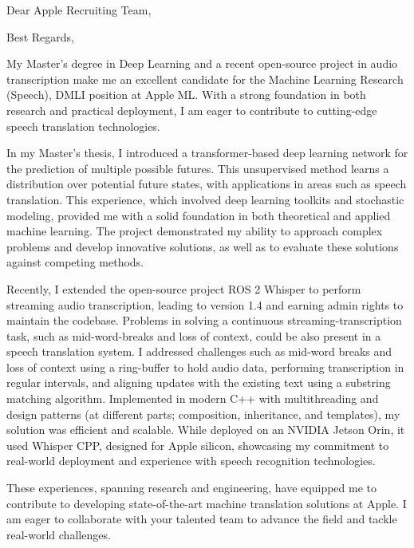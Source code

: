 \documentclass[11pt,a4paper,skipsamekey]{moderncv}
\begin{document}
	\date{\today}
	\opening{Dear Apple Recruiting Team,}
	\closing{Best Regards,}
	\makelettertitle
	
	
	My Master’s degree in Deep Learning and a recent open-source project in audio transcription make me an excellent candidate for the Machine Learning Research (Speech), DMLI position at Apple ML. With a strong foundation in both research and practical deployment, I am eager to contribute to cutting-edge speech translation technologies.
	
	In my Master’s thesis, I introduced a transformer-based deep learning network for the prediction of multiple possible futures. This unsupervised method learns a distribution over potential future states, with applications in areas such as speech translation. This experience, which involved deep learning toolkits and stochastic modeling, provided me with a solid foundation in both theoretical and applied machine learning. The project demonstrated my ability to approach complex problems and develop innovative solutions, as well as to evaluate these solutions against competing methods.
	
	
	Recently, I extended the open-source project ROS 2 Whisper to perform streaming audio transcription, leading to version 1.4 and earning admin rights to maintain the codebase. 
	Problems in solving a continuous streaming-transcription task, such as mid-word-breaks and loss of context, could be also present in a speech translation system.  
	I addressed challenges such as mid-word breaks and loss of context using a ring-buffer to hold audio data, performing transcription in regular intervals, and aligning updates with the existing text using a substring matching algorithm. Implemented in modern C++ with multithreading and design patterns (at different parts; composition, inheritance, and templates), my solution was efficient and scalable. 
	While deployed on an NVIDIA Jetson Orin, it used Whisper CPP, designed for Apple silicon, showcasing my commitment to real-world deployment and experience with speech recognition technologies.
	
	These experiences, spanning research and engineering, have equipped me to contribute to developing state-of-the-art machine translation solutions at Apple. 
	I am eager to collaborate with your talented team to advance the field and tackle real-world challenges.
	
\end{document}
